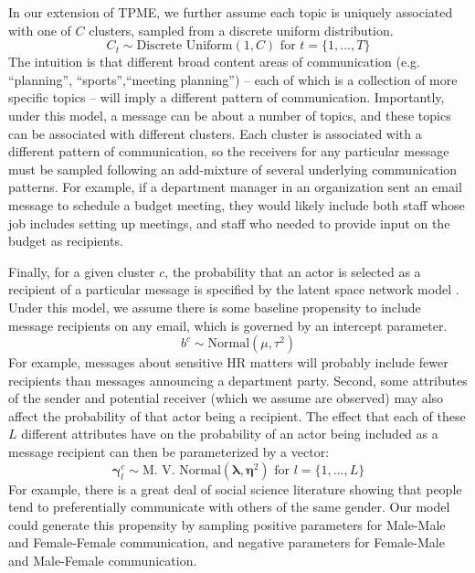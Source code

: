 \documentclass{pnastwo}
\begin{document}
\begin{article}

In our extension of TPME, we further assume each topic is uniquely associated with one of $C$ clusters, sampled from a discrete uniform distribution.
\begin{equation}
	C_t \sim \text{Discrete Uniform}(1,C) \text{ for } t = \{1, ..., T\}
\end{equation}
The intuition is that different broad content areas of communication (e.g. ``planning'', ``sports'',``meeting planning'') -- each of which is a collection of more specific topics -- will imply a different pattern of communication. Importantly, under this model, a message can be about a number of topics, and these topics can be associated with different clusters. Each cluster is associated with a different pattern of communication, so the receivers for any particular message must be sampled following an add-mixture of several underlying communication patterns. For example, if a department manager in an organization sent an email message to schedule a budget meeting, they would likely include both staff whose job includes setting up meetings, and staff who needed to provide input on the budget as recipients. 

Finally, for a given cluster $c$, the probability that an actor is selected as a recipient of a particular message is specified by the latent space network model \citep{Hoff2002a}. Under this model, we assume there is some baseline propensity to include message recipients on any email, which is governed by an intercept parameter.
\begin{equation}
	b^{c} \sim \text{Normal}(\mu, \tau^2)
\end{equation} 
For example, messages about sensitive HR matters will probably include fewer recipients than messages announcing a department party. Second, some attributes of the sender and potential receiver (which we assume are observed) may also affect the probability of that actor being a recipient. The effect that each of these $L$ different attributes have on the probability of an actor being included as a message recipient can then be parameterized by a vector: 
\begin{equation}
	\mathbf{\gamma}_l^{c} \sim \text{M. V. Normal}(\mathbf{\lambda}, \mathbf{\eta}^2) \text{ for } l = \{1, ..., L\}
\end{equation}
For example, there is a great deal of social science literature showing that people tend to preferentially communicate with others of the same gender. Our model could generate this propensity by sampling positive parameters for Male-Male and Female-Female communication, and negative parameters for Female-Male and Male-Female communication. 


\end{article}
\end{document}
